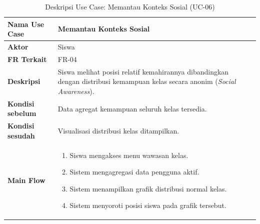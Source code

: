 \begin{table}[H]
    \centering
    \caption{Deskripsi Use Case: Memantau Konteks Sosial (UC-06)}
    \label{tbl:desc_uc06}
    \begin{tabular}{|p{}|p{}|}
        \hline
        \textbf{Nama Use Case} & \textbf{Memantau Konteks Sosial} \\
        \hline
        \textbf{Aktor} & Siswa \\
        \hline
        \textbf{FR Terkait} & FR-04 \\
        \hline
        \textbf{Deskripsi} & Siswa melihat posisi relatif kemahirannya dibandingkan dengan distribusi kemampuan kelas secara anonim (\textit{Social Awareness}). \\
        \hline
        \textbf{Kondisi sebelum} & Data agregat kemampuan seluruh kelas tersedia. \\
        \hline
        \textbf{Kondisi sesudah} & Visualisasi distribusi kelas ditampilkan. \\
        \hline
        \textbf{Main Flow} & \begin{enumerate}[noitemsep,topsep=0pt,leftmargin=*]
            \item Siswa mengakses menu wawasan kelas.
            \item Sistem mengagregasi data pengguna aktif.
            \item Sistem menampilkan grafik distribusi normal kelas.
            \item Sistem menyoroti posisi siswa pada grafik tersebut.
        \end{enumerate} \\
        \hline
    \end{tabular}
\end{table}